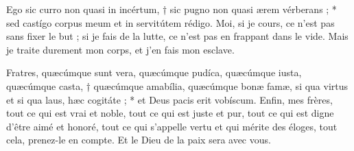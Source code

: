 \documentclass[Session2024.tex]{subfiles}
\begin{document}








{Ego sic curro non quasi in incértum, † sic pugno non quasi ærem
vérberans ; * sed castígo corpus meum et in servitútem rédigo.}
{Moi, si je cours, ce n’est pas sans fixer le but ; si je fais de la lutte, ce
n’est pas en frappant dans le vide. Mais je traite durement mon corps,
et j’en fais mon esclave.}








{Fratres, quæcúmque sunt vera, quæcúmque pudíca, quæcúmque
iusta, quæcúmque casta, † quæcúmque amabília, quæcúmque bonæ
famæ, si qua virtus et si qua laus, hæc cogitáte ; * et Deus pacis erit
vobíscum.}
{Enfin, mes frères, tout ce qui est vrai et noble, tout ce qui est juste et pur,
tout ce qui est digne d’être aimé et honoré, tout ce qui s’appelle vertu
et qui mérite des éloges, tout cela, prenez-le en compte. Et le Dieu de la
paix sera avec vous.}
\end{document}
